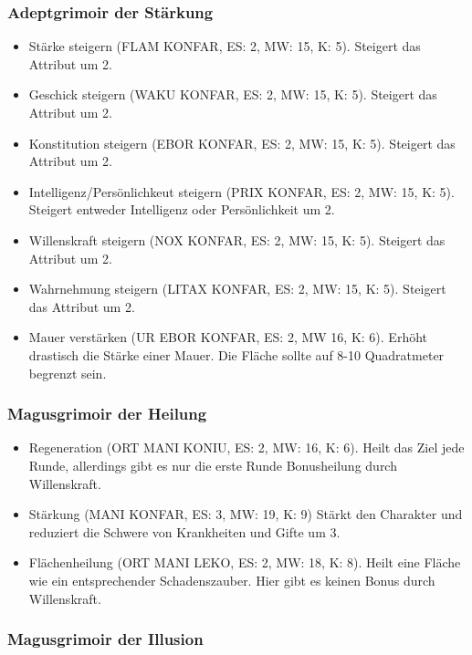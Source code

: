 \documentclass{article}
\begin{document}
\subsubsection{Adeptgrimoir der Stärkung}

\begin{itemize}
\item Stärke steigern (FLAM KONFAR, ES: 2, MW: 15, K: 5). Steigert das Attribut um 2.
\item Geschick steigern (WAKU KONFAR, ES: 2, MW: 15, K: 5). Steigert das Attribut um 2.
\item Konstitution steigern (EBOR KONFAR, ES: 2, MW: 15, K: 5). Steigert das Attribut um 2.
\item Intelligenz/Persönlichkeut steigern (PRIX KONFAR, ES: 2, MW: 15, K: 5). Steigert entweder Intelligenz oder Persönlichkeit um 2.
\item Willenskraft steigern (NOX KONFAR, ES: 2, MW: 15, K: 5). Steigert das Attribut um 2.
\item Wahrnehmung steigern (LITAX KONFAR, ES: 2, MW: 15, K: 5). Steigert das Attribut um 2.
\item Mauer verstärken (UR EBOR KONFAR, ES: 2, MW 16, K: 6). Erhöht drastisch die Stärke einer Mauer. Die Fläche sollte auf 8-10 Quadratmeter begrenzt sein.
\end{itemize}

\subsubsection{Magusgrimoir der Heilung}

\begin{itemize}
\item Regeneration (ORT MANI KONIU, ES: 2, MW: 16, K: 6). Heilt das Ziel jede Runde, allerdings gibt es nur die erste Runde Bonusheilung durch Willenskraft.
\item Stärkung (MANI KONFAR, ES: 3, MW: 19, K: 9) Stärkt den Charakter und reduziert die Schwere von Krankheiten und Gifte um 3.
\item Flächenheilung (ORT MANI LEKO, ES: 2, MW: 18, K: 8). Heilt eine Fläche wie ein entsprechender Schadenszauber. Hier gibt es keinen Bonus durch Willenskraft.
\end{itemize}

\subsubsection{Magusgrimoir der Illusion}
\end{document}
